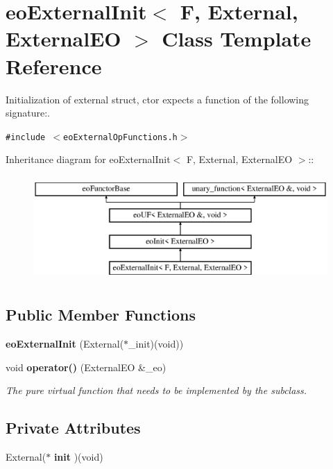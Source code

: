 \section{eo\-External\-Init$<$ F, External, External\-EO $>$ Class Template Reference}
\label{classeo_external_init}
Initialization of external struct, ctor expects a function of the following signature:.  


{\tt \#include $<$eo\-External\-Op\-Functions.h$>$}

Inheritance diagram for eo\-External\-Init$<$ F, External, External\-EO $>$::\begin{figure}[H]
\begin{center}
\leavevmode
\includegraphics[height=4cm]{classeo_external_init}
\end{center}
\end{figure}
\subsection*{Public Member Functions}
\begin{CompactItemize}
\item 
{\bf eo\-External\-Init} (External($\ast$\_\-init)(void))\label{classeo_external_init_a0}

\item 
void {\bf operator()} (External\-EO \&\_\-eo)\label{classeo_external_init_a1}

\begin{CompactList}\small\item\em The pure virtual function that needs to be implemented by the subclass. \item\end{CompactList}\end{CompactItemize}
\subsection*{Private Attributes}
\begin{CompactItemize}
\item 
External($\ast$ {\bf init} )(void)\label{classeo_external_init_r0}

\end{CompactItemize}



